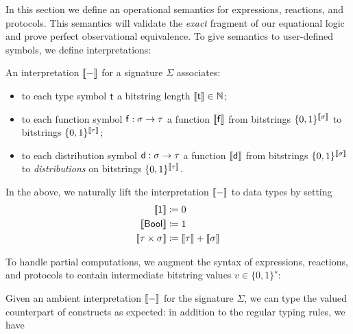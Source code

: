 In this section we define an operational semantics for expressions, reactions, and protocols. This semantics will validate the \emph{exact} fragment of our equational logic and prove perfect observational equivalence. To give semantics to user-defined symbols, we define interpretations:

\begin{definition}[Interpretation]
An interpretation $\llbracket - \rrbracket$ for a signature $\Sigma$ associates:
\begin{itemize}
\item to each type symbol $\mathsf{t}$ a bitstring length $\llbracket \mathsf{t} \rrbracket \in \mathbb{N}$;
\item to each function symbol $\mathsf{f} : \sigma \to \tau$ a function $\llbracket \mathsf{f} \rrbracket$ from bitstrings $\{0,1\}^{\llbracket \sigma \rrbracket}$ to bitstrings $\{0,1\}^{\llbracket \tau \rrbracket}$;
\item to each distribution symbol $\mathsf{d} : \sigma \to \tau$ a function $\llbracket \mathsf{d} \rrbracket$ from bitstrings $\{0,1\}^{\llbracket \sigma \rrbracket}$ to \emph{distributions} on bitstrings $\{0,1\}^{\llbracket \tau \rrbracket}$. 
\end{itemize}
\end{definition}

\noindent In the above, we naturally lift the interpretation $\llbracket - \rrbracket$ to data types by setting
\begin{align*}
\llbracket \mathsf{1} \rrbracket & \coloneqq 0 \\
\llbracket \mathsf{Bool} \rrbracket & \coloneqq 1 \\
\llbracket \tau \times \sigma \rrbracket & \coloneqq \llbracket \tau \rrbracket + \llbracket \sigma \rrbracket
\end{align*}

\noindent To handle partial computations, we augment the syntax of expressions, reactions, and protocols to contain intermediate bitstring values $v \in \{0,1\}^\star$:\smallskip

\begin{syntax}
 \alternative{\dots}
 \alternative{\dots}
 \alternative{\dots}
\end{syntax}\smallskip

\noindent Given an ambient interpretation $\llbracket - \rrbracket$ for the signature $\Sigma$, we can type the valued counterpart of \ipdl constructs as expected: in addition to the regular typing rules, we have


